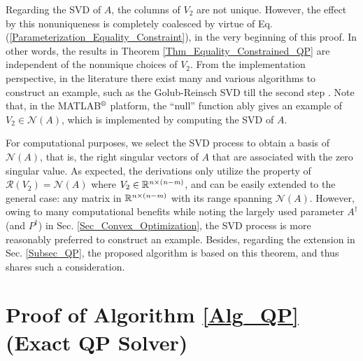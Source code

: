 \documentclass{imaman}
\newcommand{\real}{\mathbb{R}}
\newcommand{\calN}{{\mathcal N}}
\newcommand{\calR}{{\mathcal R}}
\newcommand{\itm}{{\it m}}
\newcommand{\itn}{{\it n}}
\numberwithin{equation}{section}
\begin{document}
\begin{remark}
Regarding the SVD of $A$, the columns of $V_2$ are not unique. However, the effect by this nonuniqueness is completely coalesced by virtue of Eq. (\ref{Parameterization_Equality_Constraint}), in the very beginning of this proof. In other words, the results in Theorem \ref{Thm_Equality_Constrained_QP} are independent of the nonunique choices of $V_2$. From the implementation perspective, in the literature there exist many and various algorithms to construct an example, such as the Golub-Reinsch SVD till the second step \cite{GoVa:13}. Note that, in the MATLAB$\textsuperscript{\textregistered}$ platform, the ``null'' function ably gives an example of $V_2\in\calN(A)$, which is implemented by computing the SVD of $A$.
\end{remark}

\begin{remark}
For computational purposes, we select the SVD process to obtain a basis of $\calN(A)$, that is, the right singular vectors of $A$ that are associated with the zero singular value. As expected, the derivations only utilize the property of $\calR(V_2)=\calN(A)$ where $V_2\in\real^{\itn\times(\itn-\itm)}$, and can be easily extended to the general case: any matrix in $\real^{\itn\times(\itn-\itm)}$ with its range spanning $\calN(A)$. However, owing to many computational benefits \cite{GoVa:13} while noting the largely used parameter $A^\dagger$ (and $P^\dagger$) in Sec. \ref{Sec_Convex_Optimization}, the SVD process is more reasonably preferred to construct an example. Besides, regarding the extension in Sec. \ref{Subsec_QP}, the proposed algorithm is based on this theorem, and thus shares such a consideration.
\end{remark}

\section{Proof of Algorithm \ref{Alg_QP} (Exact QP Solver)}
\label{App_Proof_QP}
\end{document}
